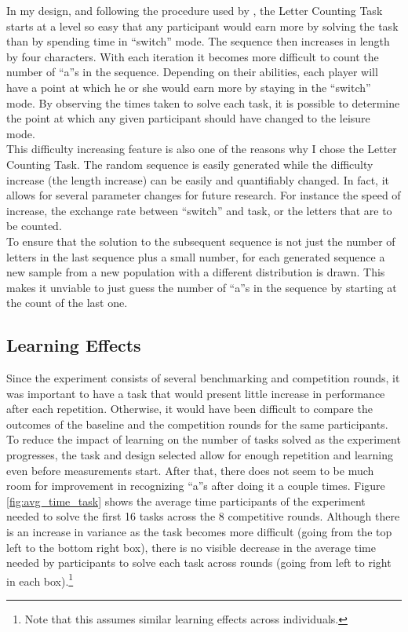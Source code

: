     In my design, and following the procedure used by \cite{sausgruber}, the Letter Counting Task starts at a level so easy that any participant would earn more by solving the task than by spending time in ``switch'' mode. The sequence then increases in length by four characters. With each iteration it becomes more difficult to count the number of ``a''s in the sequence. Depending on their abilities, each player will have a point at which he or she would earn more by staying in the ``switch'' mode. By observing the times taken to solve each task, it is possible to determine the point at which any given participant should have changed to the leisure mode.\\
    
    This difficulty increasing feature is also one of the reasons why I chose the Letter Counting Task. The random sequence is easily generated while the difficulty increase (the length increase) can be easily and quantifiably changed. In fact, it allows for several parameter changes for future research. For instance the speed of increase, the exchange rate between ``switch'' and task, or the letters that are to be counted.\\
    
    To ensure that the solution to the subsequent sequence is not just the number of letters in the last sequence plus a small number, for each generated sequence a new sample from a new population with a different distribution is drawn. This makes it unviable to just guess the number of ``a''s in the sequence by starting at the count of the last one.
    
        
    \subsection{Learning Effects}
    Since the experiment consists of several benchmarking and competition rounds, it was important to have a task that would present little increase in performance after each repetition. Otherwise, it would have been difficult to compare the outcomes of the baseline and the competition rounds for the same participants.\\
    
    To reduce the impact of learning on the number of tasks solved as the experiment progresses, the task and design selected allow for enough repetition and learning even before measurements start. 
    After that, there does not seem to be much room for improvement in recognizing ``a''s after doing it a couple times. Figure \ref{fig:avg_time_task} shows the average time participants of the experiment needed to solve the first 16 tasks across the 8 competitive rounds. Although there is an increase in variance as the task becomes more difficult (going from the top left to the bottom right box), there is no visible decrease in the average time needed by participants to solve each task across rounds (going from left to right in each box).\footnote{Note that this assumes similar learning effects across individuals.} 
    
